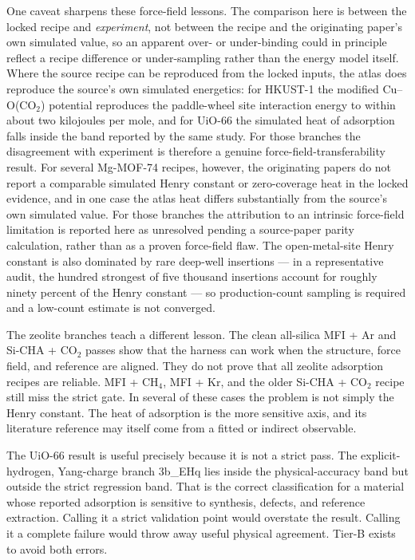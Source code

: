 One caveat sharpens these force-field lessons. The comparison here is between the locked recipe and \emph{experiment}, not between the recipe and the originating paper's own simulated value, so an apparent over- or under-binding could in principle reflect a recipe difference or under-sampling rather than the energy model itself. Where the source recipe can be reproduced from the locked inputs, the atlas does reproduce the source's own simulated energetics: for HKUST-1 the modified Cu--O(CO\(_2\)) potential reproduces the paddle-wheel site interaction energy to within about two kilojoules per mole, and for UiO-66 the simulated heat of adsorption falls inside the band reported by the same study. For those branches the disagreement with experiment is therefore a genuine force-field-transferability result. For several Mg-MOF-74 recipes, however, the originating papers do not report a comparable simulated Henry constant or zero-coverage heat in the locked evidence, and in one case the atlas heat differs substantially from the source's own simulated value. For those branches the attribution to an intrinsic force-field limitation is reported here as unresolved pending a source-paper parity calculation, rather than as a proven force-field flaw. The open-metal-site Henry constant is also dominated by rare deep-well insertions --- in a representative audit, the hundred strongest of five thousand insertions account for roughly ninety percent of the Henry constant --- so production-count sampling is required and a low-count estimate is not converged.

The zeolite branches teach a different lesson. The clean all-silica MFI + Ar and Si-CHA + CO\(_2\) passes show that the harness can work when the structure, force field, and reference are aligned. They do not prove that all zeolite adsorption recipes are reliable. MFI + CH\(_4\), MFI + Kr, and the older Si-CHA + CO\(_2\) recipe still miss the strict gate. In several of these cases the problem is not simply the Henry constant. The heat of adsorption is the more sensitive axis, and its literature reference may itself come from a fitted or indirect observable.

The UiO-66 result is useful precisely because it is not a strict pass. The explicit-hydrogen, Yang-charge branch 3b\_EHq lies inside the physical-accuracy band but outside the strict regression band. That is the correct classification for a material whose reported adsorption is sensitive to synthesis, defects, and reference extraction. Calling it a strict validation point would overstate the result. Calling it a complete failure would throw away useful physical agreement. Tier-B exists to avoid both errors.

